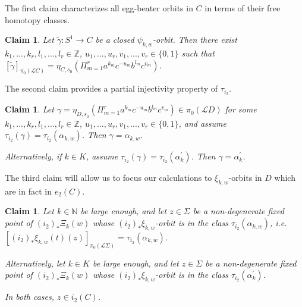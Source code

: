 \documentclass[11pt]{article}
\newtheorem{claim}[theorem]{Claim}
\newcommand{\N}{\mathbb{N}}
\newcommand{\Z}{\mathbb{Z}}
\begin{document}
            The first claim characterizes all egg-beater orbits in $C$ in terms of their free homotopy classes.
            
            \begin{claim}
            \label{claim:3}
                Let $\tilde{\gamma} : S^1 \to C$ be a closed $\psi_{k,w}$-orbit. Then there exist $k_1,...,k_r, l_1,...,l_r \in \Z$, $u_1,...,u_r, v_1,...,v_r \in \{0,1\}$ such that $[\tilde{\gamma}]_{\pi_0(\mathscr{L}C)} = \eta_{C,s_0}(\Pi_{m=1}^r a^{k_m}c^{-u_m}b^{l_m}c^{v_m})$.
            \end{claim}
            
            The second claim provides a partial injectivity property of $\tau_{i_2}$.
            
            \begin{claim}
            \label{claim:4}
                Let $\gamma = \eta_{D,s_0}(\Pi_{m=1}^r a^{k_m}c^{-u_m}b^{l_m}c^{v_m}) \in \pi_0(\mathscr{L}D)$ for some $k_1,...,k_r,l_1,...,l_r \in \Z$, $u_1,...,u_r,v_1,...,v_r \in \{0,1\}$, and assume $\tau_{i_2}(\gamma) = \tau_{i_2}(\alpha_{k,w})$. Then $\gamma = \alpha_{k,w}$.
                
                Alternatively, if $k \in K$, assume $\tau_{i_2}(\gamma) = \tau_{i_2}(\alpha_k^\prime)$. Then $\gamma = \alpha_k^\prime$.
            \end{claim}
            
            The third claim will allow us to focus our calculations to $\xi_{k,w}$-orbits in $D$ which are in fact in $e_2(C)$.
            
            \begin{claim}
            \label{claim:5}
                Let $k \in \N$ be large enough, and let $z \in \Sigma$ be a non-degenerate fixed point of $(i_2)_* \Xi_k(w)$ whose $(i_2)_* \xi_{k,w}$-orbit is in the class $\tau_{i_2}(\alpha_{k,w})$, i.e. $[(i_2)_* \xi_{k,w}(t) (z)]_{\pi_0(\mathscr{L}\Sigma)} = \tau_{i_2}(\alpha_{k,w})$.
                
                Alternatively, let $k \in K$ be large enough, and let $z \in \Sigma$ be a non-degenerate fixed point of $(i_2)_* \Xi_k(w)$ whose $(i_2)_* \xi_{k,w}$-orbit is in the class $\tau_{i_2}(\alpha_k^\prime)$.
                
                In both cases, $z \in i_2(C)$. \\
            \end{claim}
            
\end{document}

